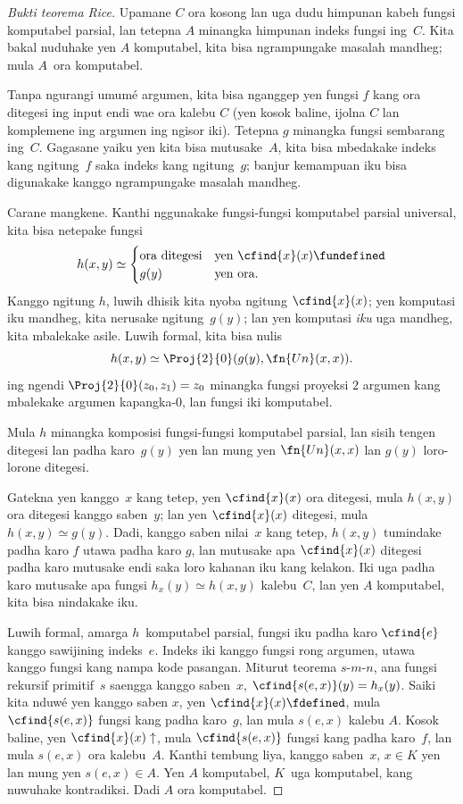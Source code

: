 \documentclass[../../../include/open-logic-section]{subfiles}
\begin{document}
\begin{proof}[Bukti teorema Rice]
Upamane $C$ ora kosong lan uga dudu himpunan kabeh
fungsi komputabel parsial, lan tetepna $A$ minangka
himpunan indeks fungsi ing~$C$. Kita bakal nuduhake
yen $A$ komputabel, kita bisa ngrampungake masalah
mandheg; mula $A$~ora komputabel.

Tanpa ngurangi umumé argumen, kita bisa nganggep
yen fungsi $f$ kang ora ditegesi ing input endi wae
ora kalebu $C$ (yen kosok baline, ijolna $C$ lan
komplemene ing argumen ing ngisor iki). Tetepna $g$
minangka fungsi sembarang ing~$C$. Gagasane yaiku
yen kita bisa mutusake~$A$, kita bisa mbedakake
indeks kang ngitung~$f$ saka indeks kang ngitung~$g$;
banjur kemampuan iku bisa digunakake kanggo
ngrampungake masalah mandheg.

Carane mangkene. Kanthi nggunakake fungsi-fungsi
komputabel parsial universal, kita bisa netepake fungsi
\[
h(x,y) \simeq
\begin{cases}
\text{ora ditegesi} & \text{yen $\cfind{x}(x) \fundefined$} \\
g(y) & \text{yen ora.}
\end{cases}
\]
Kanggo ngitung $h$, luwih dhisik kita nyoba ngitung
$\cfind{x}(x)$; yen komputasi iku mandheg, kita
nerusake ngitung~$g(y)$; lan yen komputasi
{\em iku} uga mandheg, kita mbalekake asile.
Luwih formal, kita bisa nulis
\[
h(x,y) \simeq \Proj{2}{0}(g(y),\fn{Un}(x,x)).
\]
ing ngendi $\Proj{2}{0}(z_0, z_1) = z_0$ minangka
fungsi proyeksi $2$ argumen kang mbalekake argumen
kapangka-$0$, lan fungsi iki komputabel.

Mula $h$ minangka komposisi fungsi-fungsi komputabel
parsial, lan sisih tengen ditegesi lan padha
karo~$g(y)$ yen lan mung yen $\fn{Un}(x,x)$ lan $g(y)$
loro-lorone ditegesi.

Gatekna yen kanggo~$x$ kang tetep, yen
$\cfind{x}(x)$ ora ditegesi, mula $h(x,y)$
ora ditegesi kanggo saben~$y$; lan yen
$\cfind{x}(x)$ ditegesi, mula $h(x,y) \simeq g(y)$.
Dadi, kanggo saben nilai~$x$ kang tetep,
$h(x,y)$ tumindake padha karo $f$ utawa padha
karo $g$, lan mutusake apa $\cfind{x}(x)$
ditegesi padha karo mutusake endi saka loro
kahanan iku kang kelakon. Iki uga padha karo
mutusake apa fungsi $h_x(y) \simeq h(x,y)$ kalebu~$C$,
lan yen $A$ komputabel, kita bisa nindakake iku.

Luwih formal, amarga $h$~komputabel parsial,
fungsi iku padha karo $\cfind{e}$ kanggo sawijining
indeks~$e$. Indeks iki kanggo fungsi rong argumen, utawa kanggo fungsi kang nampa kode pasangan. Miturut teorema $s$-$m$-$n$, ana
fungsi rekursif primitif~$s$ saengga kanggo saben~$x$,
$\cfind{s(e,x)}(y) = h_x(y)$. Saiki kita nduwé yen
kanggo saben $x$, yen $\cfind{x}(x) \fdefined$,
mula $\cfind{s(e,x)}$ fungsi kang padha karo~$g$,
lan mula $s(e,x)$ kalebu $A$. Kosok baline,
yen $\cfind{x}(x) \uparrow$, mula
$\cfind{s(e,x)}$ fungsi kang padha karo~$f$,
lan mula $s(e,x)$ ora kalebu~$A$. Kanthi tembung
liya, kanggo saben~$x$, $x
\in K$ yen lan mung yen $s(e,x) \in A$.
Yen $A$ komputabel, $K$~uga komputabel,
kang nuwuhake kontradiksi. Dadi $A$ ora komputabel.
\end{proof}
\end{document}
